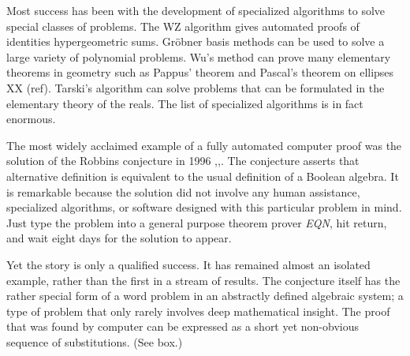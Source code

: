 \documentclass{llncs}
\begin{document}
Most success has been with
the development of specialized algorithms to solve special classes
of problems.  The WZ algorithm  gives  automated proofs of identities
hypergeometric sums.   Gr\"obner basis
methods can be used to solve a large variety of polynomial problems.  
Wu's method 
can prove many elementary theorems in geometry such as Pappus' theorem
and Pascal's theorem on ellipses XX (ref).  Tarski's algorithm can solve
problems that can be formulated in the elementary theory of the reals.
The list of specialized algorithms is in fact enormous.

The most widely acclaimed example of a fully automated computer proof
was the solution of the Robbins conjecture in 1996 \cite{Mc1},\cite{Mc2},\cite{Kol}.  
The conjecture asserts that alternative definition is equivalent
to the usual definition of a Boolean algebra.
It is remarkable
because the solution did not involve any human assistance,
specialized algorithms, or software
designed with this particular problem in mind.
Just type the problem into a general purpose
theorem prover {\it EQN}, hit return, and wait
eight days for the solution to appear.

Yet the story is only a qualified success.  It has
remained almost an isolated example, rather than the first in a stream
of results.  The conjecture itself has the rather special form of a
word problem in an
abstractly defined algebraic system; a type of
problem that only rarely involves deep mathematical insight. The proof that was found by
computer can be expressed as a short yet non-obvious sequence
of substitutions. (See box.)
\end{document}
